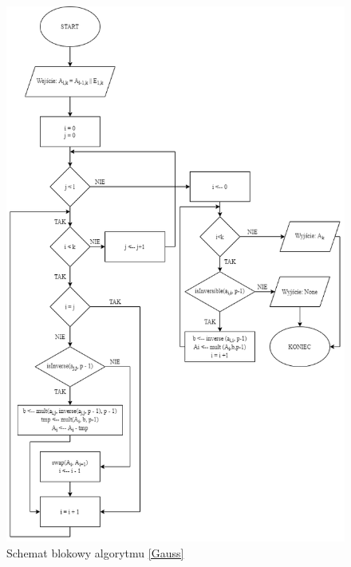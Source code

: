 \documentclass[]{article}
\begin{document}
				
	\begin{figure}[H]
		\begin{center}
		\includegraphics[width = 12cm]{alg9.png} \caption{Schemat blokowy algorytmu \ref{Gauss}}
		\end{center}
	\end{figure}

	
	
\end{document}
